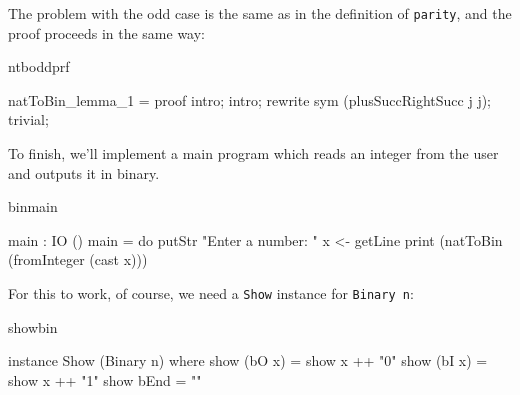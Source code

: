 \noindent
The problem with the odd case is the same as in the definition of \texttt{parity}, and
the proof proceeds in the same way:

\begin{SaveVerbatim}{ntboddprf}

natToBin_lemma_1 = proof {
    intro;
    intro;
    rewrite sym (plusSuccRightSucc j j);
    trivial;
}

\end{SaveVerbatim}

\noindent
To finish, we'll implement a main program which reads an integer from the user and
outputs it in binary. 

\begin{SaveVerbatim}{binmain}

main : IO ()
main = do putStr "Enter a number: "
          x <- getLine
          print (natToBin (fromInteger (cast x)))

\end{SaveVerbatim}

\noindent
For this to work, of course, we need a \texttt{Show} instance for \texttt{Binary n}:

\begin{SaveVerbatim}{showbin}

instance Show (Binary n) where
    show (bO x) = show x ++ "0"
    show (bI x) = show x ++ "1"
    show bEnd = ""

\end{SaveVerbatim}


